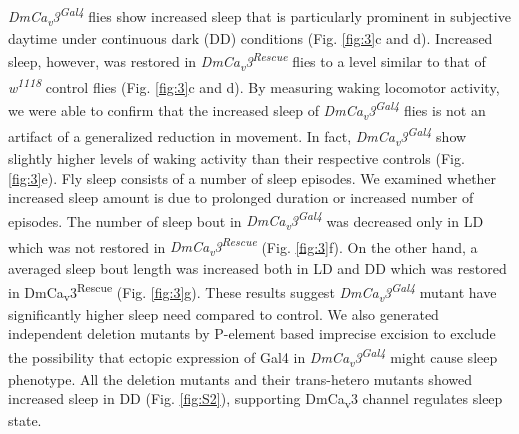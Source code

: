 \emph{DmCa\textsubscript{v}3\textsuperscript{Gal4}} flies show increased sleep that is particularly prominent in subjective daytime under continuous dark (DD) conditions (Fig. \ref{fig:3}c and d).
Increased sleep, however, was restored in \emph{DmCa\textsubscript{v}3\textsuperscript{Rescue}} flies to a level similar to that of \emph{w\textsuperscript{1118}} control flies (Fig. \ref{fig:3}c and d).
By measuring waking locomotor activity, we were able to confirm that the increased sleep of \emph{DmCa\textsubscript{v}3\textsuperscript{Gal4}} flies is not an artifact of a generalized reduction in movement. In fact, \emph{DmCa\textsubscript{v}3\textsuperscript{Gal4}} show slightly higher levels of waking activity than their respective controls (Fig. \ref{fig:3}e).
Fly sleep consists of a number of sleep episodes.
We examined whether increased sleep amount is due to prolonged duration or increased number of episodes.
The number of sleep bout in \emph{DmCa\textsubscript{v}3\textsuperscript{Gal4}} was decreased only in LD which was not restored in \emph{DmCa\textsubscript{v}3\textsuperscript{Rescue}} (Fig. \ref{fig:3}f).
On the other hand, a averaged sleep bout length was increased both in LD and DD which was restored in DmCa\textsubscript{v}3\textsuperscript{Rescue} (Fig. \ref{fig:3}g).
These results suggest \emph{DmCa\textsubscript{v}3\textsuperscript{Gal4}} mutant have significantly higher sleep need compared to control.
We also generated independent deletion mutants by P-element based imprecise excision to exclude the possibility that ectopic expression of Gal4 in \emph{DmCa\textsubscript{v}3\textsuperscript{Gal4}} might cause sleep phenotype.
All the deletion mutants and their trans-hetero mutants showed increased sleep in DD (Fig. \ref{fig:S2}), supporting DmCa\textsubscript{v}3 channel regulates sleep state.
    
  
  
  
  
  
  
  